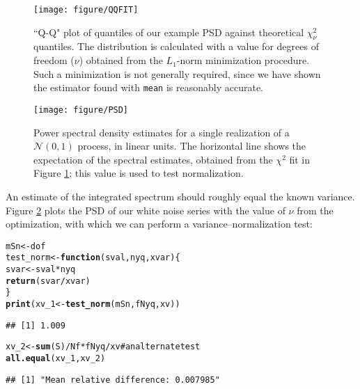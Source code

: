 \documentclass[11pt]{article}\usepackage{graphicx, color}
\makeatletter
\def\maxwidth{ %
  \ifdim\Gin@nat@width>\linewidth
    \linewidth
  \else
    \Gin@nat@width
  \fi
}
\newcommand{\hlfunctioncall}[1]{\textcolor[rgb]{0.501960784313725,0,0.329411764705882}{\textbf{#1}}}%
\newcommand{\hlcomment}[1]{\textcolor[rgb]{0.180392156862745,0.6,0.341176470588235}{#1}}%
\newenvironment{kframe}{%
 \def\at@end@of@kframe{}%
 \ifinner\ifhmode%
  \def\at@end@of@kframe{\end{minipage}}%
  \begin{minipage}{\columnwidth}%
 \fi\fi%
 \def\FrameCommand##1{\hskip\@totalleftmargin \hskip-\fboxsep
 \colorbox{shadecolor}{##1}\hskip-\fboxsep
     \hskip-\linewidth \hskip-\@totalleftmargin \hskip\columnwidth}%
 \MakeFramed {\advance\hsize-\width
   \@totalleftmargin\z@ \linewidth\hsize
   \@setminipage}}%
 {\par\unskip\endMakeFramed%
 \at@end@of@kframe}
\newenvironment{knitrout}{}{} %
\newcommand{\Rcmd}[1]{\texttt{#1}}
\makeatother
\begin{document}
\begin{figure}[htb!]
\begin{center}
\begin{knitrout}
\color{fgcolor}
\texttt{[image: figure/QQFIT]} 

\end{knitrout}

\caption{``Q-Q" plot of 
quantiles of our example PSD
 against
 theoretical $\chi^2_\nu$ quantiles.  The distribution is calculated
with a value for degrees of freedom ($\nu$) obtained from the
$L_1$-norm minimization procedure.  Such a minimization is not
generally required, since we have shown the estimator found with \Rcmd{mean}
is reasonably accurate.}
\label{fig:qqchi}
\end{center}
\end{figure}

\begin{figure}[htb!]
\begin{center}
\begin{knitrout}
\color{fgcolor}
\texttt{[image: figure/PSD]} 

\end{knitrout}

\caption{Power spectral density estimates for a single realization of a 
$\mathcal{N}(0,1)$ process, in linear units.  
The horizontal line shows the expectation of the spectral estimates, obtained
from the $\chi^2$ fit in Figure \ref{fig:qqchi}; this value is
used to test normalization.}
\label{fig:psdN}
\end{center}
\end{figure}

An estimate of the integrated spectrum
should roughly equal the known variance.
Figure \ref{fig:psdN} plots the PSD of our white noise series with
the value of $\nu$ from the optimization, 
with which we can perform a variance--normalization
test:
\begin{knitrout}
\color{fgcolor}\begin{kframe}
\begin{alltt}
mSn <- dof
test_norm <- \hlfunctioncall{function}(sval, nyq, xvar) \{
    svar <- sval * nyq
    \hlfunctioncall{return}(svar/xvar)
\}
\hlfunctioncall{print}(xv_1 <- \hlfunctioncall{test_norm}(mSn, fNyq, xv))
\end{alltt}
\begin{verbatim}
## [1] 1.009
\end{verbatim}
\begin{alltt}
xv_2 <- \hlfunctioncall{sum}(S)/Nf * fNyq/xv  \hlcomment{# an alternate test}
\hlfunctioncall{all.equal}(xv_1, xv_2)
\end{alltt}
\begin{verbatim}
## [1] "Mean relative difference: 0.007985"
\end{verbatim}
\end{kframe}
\end{knitrout}
\end{document}

